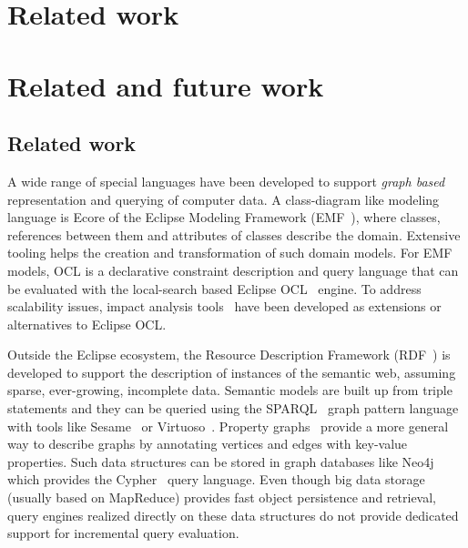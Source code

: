 \chapter{Related work}
\label{chap:related-work}

\chapter{Related and future work}










\section{Related work}
\label{sec:relwork}

A wide range of special languages have been developed to support \emph{graph based} representation and querying of computer data. A class-diagram like modeling language is Ecore of the Eclipse Modeling Framework (EMF~\cite{EMF}), where classes, references between them and attributes of classes describe the domain. Extensive tooling helps the creation and transformation of such domain models. For EMF models, OCL is a declarative constraint description and query language that can be evaluated with the local-search based Eclipse OCL~\cite{EclipseOCL} engine. To address scalability issues, impact analysis tools~\cite{OCLIA} have been developed as extensions or alternatives to Eclipse OCL.

Outside the Eclipse ecosystem, the Resource Description Framework (RDF~\cite{website:rdf_standard}) is developed to support the description of instances of the semantic web, assuming sparse, ever-growing, incomplete data. Semantic models are built up from triple statements and they can be queried using the SPARQL~\cite{SPARQL} graph pattern language with tools like Sesame~\cite{sesame} or Virtuoso~\cite{openvirtuoso}. Property graphs~\cite{DBLP:journals/corr/abs-1006-2361} provide a more general way to describe graphs by annotating vertices and edges with key-value properties. Such data structures can be stored in graph databases like Neo4j~\cite{neo4j} which provides the Cypher~\cite{cypher} query language. Even though big data storage (usually based on MapReduce) provides fast object persistence and retrieval, query engines realized directly on these data structures do not provide dedicated support for incremental query evaluation. 

